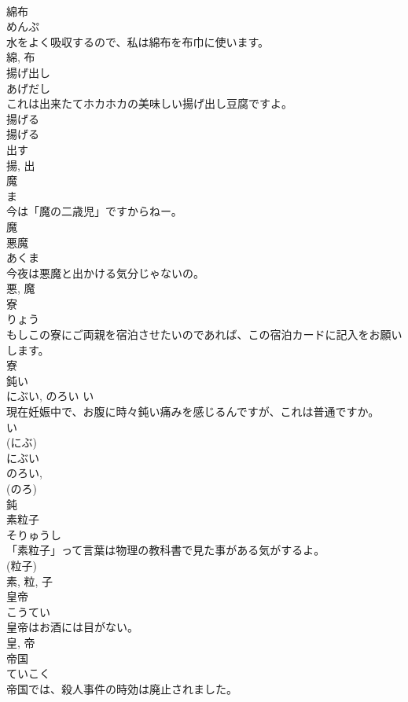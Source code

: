 \documentclass[8pt]{extreport}
\begin{document}
\begin{CJK}{UTF8}{min}
\\	綿布	
\\	めんぷ	
\\	水をよく吸収するので、私は綿布を布巾に使います。	
\\	綿, 布	
\\	揚げ出し	
\\	あげだし	
\\	これは出来たてホカホカの美味しい揚げ出し豆腐ですよ。	
\\	揚げる 
\\	揚げる 
\\	出す
\\	揚, 出	
\\	魔	
\\	ま	
\\	今は「魔の二歳児」ですからねー。	
\\	魔	
\\	悪魔	
\\	あくま	
\\	今夜は悪魔と出かける気分じゃないの。	
\\	悪, 魔	
\\	寮	
\\	りょう	
\\	もしこの寮にご両親を宿泊させたいのであれば、この宿泊カードに記入をお願いします。	
\\	寮	
\\	鈍い	
\\	にぶい, のろい	い 
\\	現在妊娠中で、お腹に時々鈍い痛みを感じるんですが、これは普通ですか。	
\\	い 
\\	(にぶ) 
\\	にぶい 
\\	のろい, 
\\	(のろ) 
\\	鈍	
\\	素粒子	
\\	そりゅうし	
\\	「素粒子」って言葉は物理の教科書で見た事がある気がするよ。	
\\	(粒子) 
\\	素, 粒, 子	
\\	皇帝	
\\	こうてい	
\\	皇帝はお酒には目がない。	
\\	皇, 帝	
\\	帝国	
\\	ていこく	
\\	帝国では、殺人事件の時効は廃止されました。	

\end{CJK}
\end{document}
